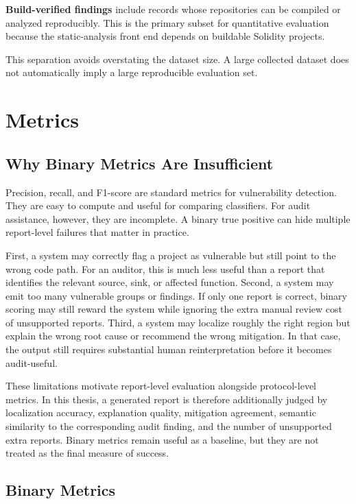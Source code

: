 \textbf{Build-verified findings} include records whose repositories can be
compiled or analyzed reproducibly. This is the primary subset for quantitative
evaluation because the static-analysis front end depends on buildable Solidity
projects.

This separation avoids overstating the dataset size. A large collected dataset
does not automatically imply a large reproducible evaluation set.

\section{Metrics}

\subsection{Why Binary Metrics Are Insufficient}

Precision, recall, and F1-score are standard metrics for vulnerability
detection. They are easy to compute and useful for comparing classifiers. For
audit assistance, however, they are incomplete. A binary true positive can hide
multiple report-level failures that matter in practice.

First, a system may correctly flag a project as vulnerable but still point to
the wrong code path. For an auditor, this is much less useful than a report
that identifies the relevant source, sink, or affected function. Second, a
system may emit too many vulnerable groups or findings. If only one report is
correct, binary scoring may still reward the system while ignoring the extra
manual review cost of unsupported reports. Third, a system may localize roughly
the right region but explain the wrong root cause or recommend the wrong
mitigation. In that case, the output still requires substantial human
reinterpretation before it becomes audit-useful.

These limitations motivate report-level evaluation alongside protocol-level
metrics. In this thesis, a generated report is therefore additionally judged by
localization accuracy, explanation quality, mitigation agreement, semantic
similarity to the corresponding audit finding, and the number of unsupported
extra reports. Binary metrics remain useful as a baseline, but they are not
treated as the final measure of success.

\subsection{Binary Metrics}

